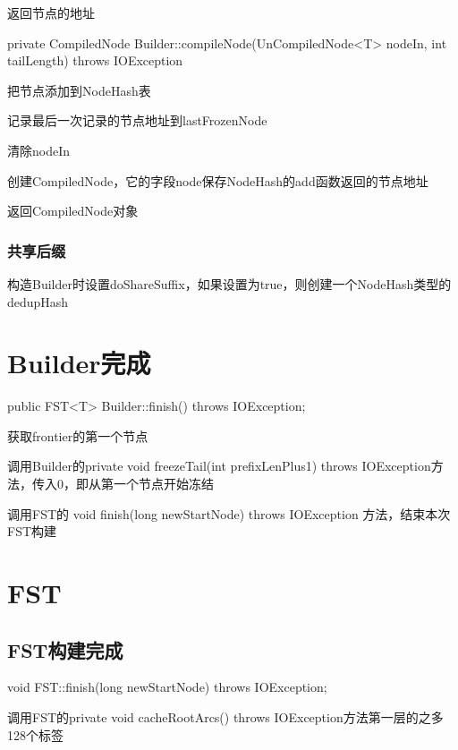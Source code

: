 \documentclass{article}
\begin{document}
返回节点的地址


private CompiledNode Builder::compileNode(UnCompiledNode<T> nodeIn, int tailLength) throws IOException

把节点添加到NodeHash表

记录最后一次记录的节点地址到lastFrozenNode

清除nodeIn

创建CompiledNode，它的字段node保存NodeHash的add函数返回的节点地址

返回CompiledNode对象

\subsubsection{共享后缀}

构造Builder时设置doShareSuffix，如果设置为true，则创建一个NodeHash类型的dedupHash


\section{Builder完成}

public FST<T> Builder::finish() throws IOException;

获取frontier的第一个节点

调用Builder的private void freezeTail(int prefixLenPlus1) throws IOException方法，传入0，即从第一个节点开始冻结

调用FST的 void finish(long newStartNode) throws IOException 方法，结束本次FST构建

\section{FST}

\subsection{FST构建完成}

void FST::finish(long newStartNode) throws IOException;



调用FST的private void cacheRootArcs() throws IOException方法第一层的之多128个标签
\end{document}
